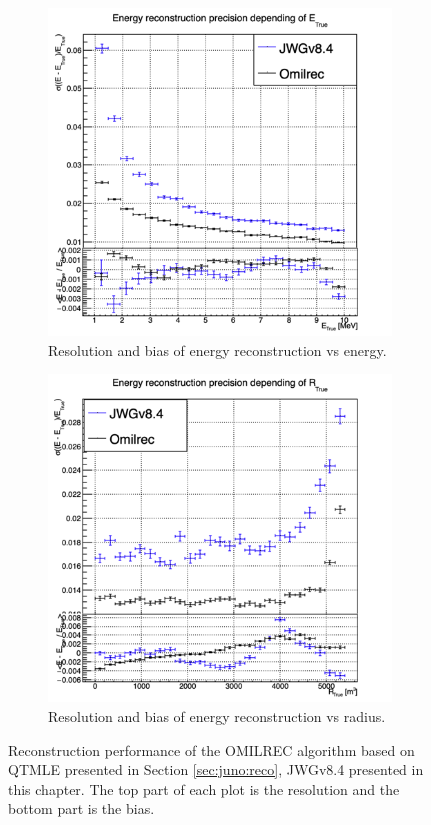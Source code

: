 \documentclass[../main.tex]{subfiles}
\begin{document}
\begin{figure}[ht]
  \centering
  \begin{subfigure}[t]{0.48\linewidth}
    \centering
    \includegraphics[width=\linewidth]{images/jgnn/MESBvET_nox.png}
    \caption{Resolution and bias of energy reconstruction vs energy.}
    \label{fig:jgnn:MESBvETC_nox}
  \end{subfigure}
  \begin{subfigure}[t]{0.48\linewidth}
    \centering
    \includegraphics[width=\linewidth]{images/jgnn/MESBvRT_nox.png}
    \caption{Resolution and bias of energy reconstruction vs radius.}
    \label{fig:jgnn:MESBvRTC_nox}
  \end{subfigure}
  \caption{Reconstruction performance of the OMILREC algorithm based on QTMLE presented in Section \ref{sec:juno:reco}, JWGv8.4 presented in this chapter. The top part of each plot is the resolution and the bottom part is the bias.}
  \label{fig:jgnn:results_nox_1}
\end{figure}
\end{document}
